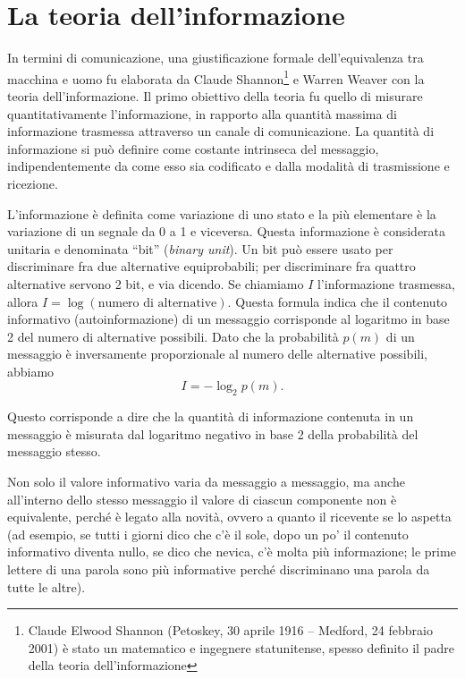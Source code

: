 \section{La teoria dell'informazione}
In termini di comunicazione, una giustificazione formale dell'equivalenza tra macchina e uomo fu elaborata da Claude Shannon\footnote{Claude Elwood Shannon (Petoskey, 30 aprile 1916 – Medford, 24 febbraio 2001) è stato un matematico e ingegnere statunitense, spesso definito il padre della teoria dell'informazione} e Warren Weaver con la teoria dell'informazione. Il primo obiettivo della teoria fu quello di misurare quantitativamente l'informazione, in rapporto alla quantità massima di informazione trasmessa attraverso un canale di comunicazione. La quantità di informazione si può definire come costante intrinseca del messaggio, indipendentemente da come esso sia codificato e dalla modalità di trasmissione e ricezione.

L'informazione è definita come variazione di uno stato e la più elementare è la variazione di un segnale da 0 a 1 e viceversa. Questa informazione è considerata unitaria e denominata ``bit'' (\emph{binary unit}). Un bit può essere usato per discriminare fra due alternative equiprobabili; per discriminare fra quattro alternative servono 2 bit, e via dicendo. Se chiamiamo $I$ l'informazione trasmessa, allora $I = \log (\text{numero di alternative})$. Questa formula indica che il contenuto informativo (autoinformazione) di un messaggio corrisponde al logaritmo in base 2 del numero di alternative possibili. Dato che la probabilità $p(m)$ di un messaggio è inversamente proporzionale al numero delle alternative possibili, abbiamo
\begin{equation}
	I = -\log_{2}{p(m)}.
\end{equation}

Questo corrisponde a dire che la quantità di informazione contenuta in un messaggio è misurata dal logaritmo negativo in base 2 della probabilità del messaggio stesso.

Non solo il valore informativo varia da messaggio a messaggio, ma anche all'interno dello stesso messaggio il valore di ciascun componente non è equivalente, perché è legato alla novità, ovvero a quanto il ricevente se lo aspetta (ad esempio, se tutti i giorni dico che c'è il sole, dopo un po' il contenuto informativo diventa nullo, se dico che nevica, c'è molta più informazione; le prime lettere di una parola sono più informative perché discriminano una parola da tutte le altre).

